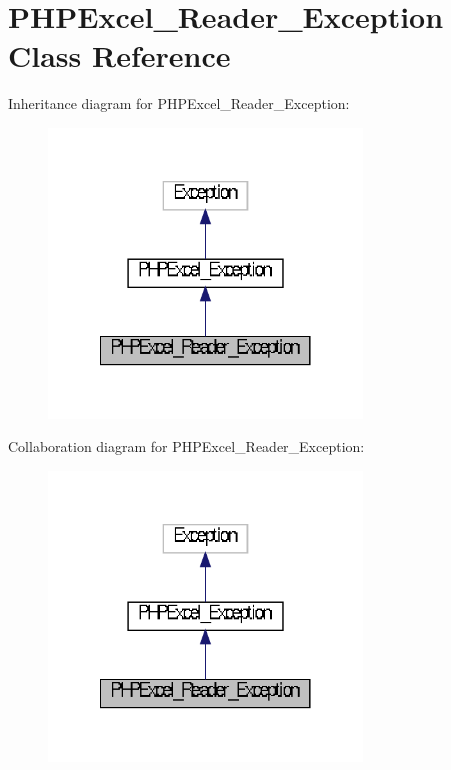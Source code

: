 \section{P\+H\+P\+Excel\+\_\+\+Reader\+\_\+\+Exception Class Reference}
\label{class_p_h_p_excel___reader___exception}


Inheritance diagram for P\+H\+P\+Excel\+\_\+\+Reader\+\_\+\+Exception\+:\nopagebreak
\begin{figure}[H]
\begin{center}
\leavevmode
\includegraphics[width=236pt]{class_p_h_p_excel___reader___exception__inherit__graph}
\end{center}
\end{figure}


Collaboration diagram for P\+H\+P\+Excel\+\_\+\+Reader\+\_\+\+Exception\+:\nopagebreak
\begin{figure}[H]
\begin{center}
\leavevmode
\includegraphics[width=236pt]{class_p_h_p_excel___reader___exception__coll__graph}
\end{center}
\end{figure}
